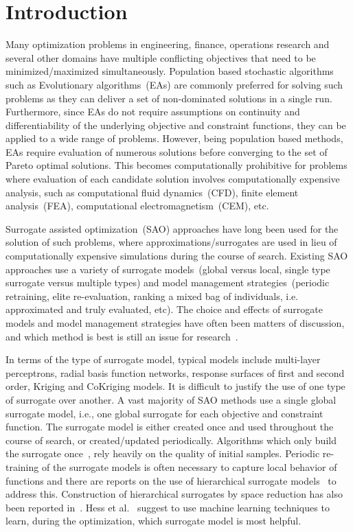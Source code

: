 \section{Introduction} Many optimization problems in engineering, finance, operations research and
several other domains have multiple conflicting objectives that need to be minimized/maximized
simultaneously. Population based stochastic algorithms such as Evolutionary algorithms~(EAs) are
commonly preferred for solving such problems as they can deliver a set of non-dominated solutions in
a single run. Furthermore, since EAs do not require assumptions on continuity and differentiability
of the underlying objective and constraint functions, they can be applied to a wide range of
problems. However, being population based methods, EAs require evaluation of numerous solutions
before converging to the set of Pareto optimal solutions. This becomes computationally
prohibitive for problems where evaluation of each candidate solution involves computationally
expensive analysis, such as computational fluid dynamics~(CFD), finite element analysis~(FEA),
computational electromagnetism~(CEM), etc.

Surrogate assisted optimization~(SAO) approaches have long been used for the solution of such
problems, where approximations/surrogates are used in lieu of computationally expensive simulations
during the course of search. Existing SAO approaches use a variety of surrogate models~(global
versus local, single type surrogate versus multiple types) and model management strategies~(periodic
retraining, elite re-evaluation, ranking a mixed bag of individuals, i.e. approximated and truly
evaluated, etc). The choice and effects of surrogate models and model management strategies have
often been matters of discussion, and which method is best is still an issue for
research~\cite{wang_review_2007, jin2005csf}.

In terms of the type of surrogate model, typical models include multi-layer perceptrons, radial
basis function networks, response surfaces of first and second order, Kriging and CoKriging models.
It is difficult to justify the use of one type of surrogate over another. A vast majority of SAO
methods use a single global surrogate model, i.e., one global surrogate for each objective and
constraint function. The surrogate model is either created once and used throughout the course of
search, or created/updated periodically. Algorithms which only build the surrogate
once~\cite{wilson2001epf,goel_ensemble_2007}, rely heavily on the quality of initial samples.
Periodic re-training of the surrogate models is often necessary to capture local behavior of
functions and there are reports on the use of hierarchical surrogate
models~\cite{zhou_combining_2007} to address this. Construction of hierarchical surrogates by space
reduction has also been reported in~\cite{wang_fuzzy_2004}. Hess et al.~\cite{Hess13} suggest to use
machine learning techniques to learn, during the optimization, which surrogate model is most
helpful.

